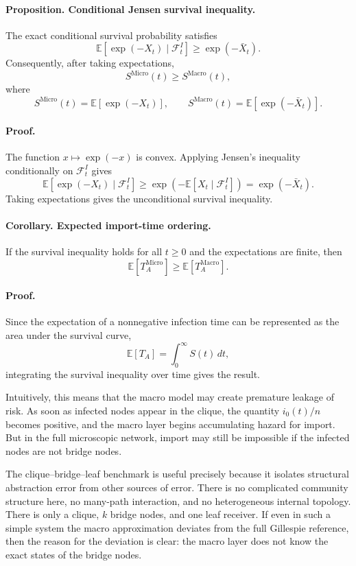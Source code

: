 \documentclass{article}
\begin{document}
\paragraph{Proposition. Conditional Jensen survival inequality.}
The exact conditional survival probability satisfies
\[
\mathbb{E}\!\left[\exp(-X_t)\mid\mathcal F_t^I\right]
\geq
\exp(-\bar X_t).
\]
Consequently, after taking expectations,
\[
S^{\mathrm{Micro}}(t)
\geq
S^{\mathrm{Macro}}(t),
\]
where
\[
S^{\mathrm{Micro}}(t)
=
\mathbb{E}\!\left[\exp(-X_t)\right],
\qquad
S^{\mathrm{Macro}}(t)
=
\mathbb{E}\!\left[\exp(-\bar X_t)\right].
\]

\paragraph{Proof.}
The function \(x\mapsto \exp(-x)\) is convex. Applying Jensen's inequality conditionally on \(\mathcal F_t^I\) gives
\[
\mathbb{E}\!\left[\exp(-X_t)\mid\mathcal F_t^I\right]
\geq
\exp\!\left(
-\mathbb{E}[X_t\mid\mathcal F_t^I]
\right)
=
\exp(-\bar X_t).
\]
Taking expectations gives the unconditional survival inequality.

\paragraph{Corollary. Expected import-time ordering.}
If the survival inequality holds for all \(t\ge 0\) and the expectations are finite, then
\[
\mathbb{E}[T_A^{\mathrm{Micro}}]
\geq
\mathbb{E}[T_A^{\mathrm{Macro}}].
\]

\paragraph{Proof.}
Since the expectation of a nonnegative infection time can be represented as the area under the survival curve,
\[
\mathbb{E}[T_A]
=
\int_0^\infty S(t)\,dt,
\]
integrating the survival inequality over time gives the result.

Intuitively, this means that the macro model may create premature leakage of risk. As soon as infected nodes appear in the clique, the quantity \(i_0(t)/n\) becomes positive, and the macro layer begins accumulating hazard for import. But in the full microscopic network, import may still be impossible if the infected nodes are not bridge nodes.

The clique--bridge--leaf benchmark is useful precisely because it isolates structural abstraction error from other sources of error. There is no complicated community structure here, no many-path interaction, and no heterogeneous internal topology. There is only a clique, \(k\) bridge nodes, and one leaf receiver. If even in such a simple system the macro approximation deviates from the full Gillespie reference, then the reason for the deviation is clear: the macro layer does not know the exact states of the bridge nodes.
\end{document}
